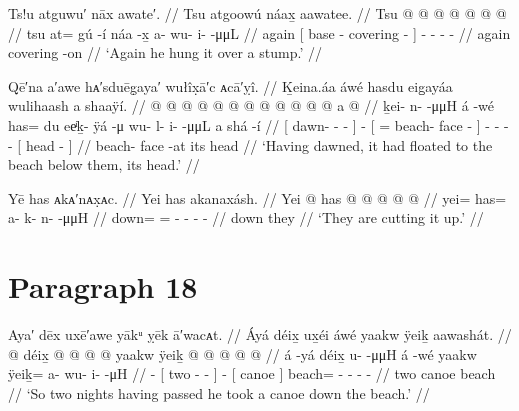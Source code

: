 \ex\label{ex:91-244-again-hung-over-stump}%
%
\begingl
	\glpreamble	Ts!u atguwu′ nāx awate′. //
	\glpreamble	Tsu atgoowú náax̱ aawatee. //
	\gla	Tsu {}  @ {} @ {}  @ {} {}
		 @ {} @ {} @ {} @ {} //
	\glb	tsu {} at= gú -í náa -x̱ {}
		a- wu- i-  -μμL //
	\glc	again {}[  base - covering - {}]
		- - -  - //
	\gld	again {}  {} {} covering -on {}
		 {} {} {} {} //
	\glft	‘Again he hung it over a stump.’
		//
\endgl
\xe

\ex\label{ex:91-245-dawned-float-beach-head}%
%
\begingl
	\glpreamble	Qē′na a′awe hᴀ′sduēg̣aya′ wułîx̣ā′c ᴀcā′ỵî. //
	\glpreamble	Ḵeina.áa áwé hasdu eig̱ayáa wulihaash a shaaÿí. //
	\gla	{}  @ {} @ {} @ {} @ {} {}  @ {}
		{}  @ {}  @ {} @ {} {}
		 @ {} @ {} @ {} @ {}
		{} a  @ {} {} //
	\glb	{} ḵei- n-  -μμH {} {} á -wé
		{} has= du eeͥḵ- ÿá -μ {}
		wu- l- i-  -μμL
		{} a shá -í {} //
	\glc	{}[ dawn- -  - \· {}]
		 -
		{}[ =  beach- face - {}]
		- - -  -
		{}[  head - {}] //
	\gld	{}  {} {} {} {} {}  {}
		{}  {} beach- face -at {}
		 {} {} {} {}
		{} its head {} {} //
	\glft	‘Having dawned, it had floated to the beach below them, its head.’
		//
\endgl
\xe

\ex\label{ex:91-246-they-cut-it-up}%
%
\begingl
	\glpreamble	Yē has ᴀkᴀ′nᴀx̣ᴀc. //
	\glpreamble	Yei has akanaxásh. //
	\gla	Yei @ has @  @ {} @ {} @ {} @ {} //
	\glb	yei= has= a- k- n-  -μμH //
	\glc	down= = - - -  - //
	\gld	down they  {} {} {} {} //
	\glft	‘They are cutting it up.’
		//
\endgl
\xe

\section{Paragraph 18}\label{sec:91-para-18}

\ex\label{ex:91-247-two-nights-took-canoe-beach}%
%
\begingl
	\glpreamble	Aya′ dēx uxē′awe yākᵘ ỵēk ā′wacᴀt. //
	\glpreamble	Áyá déix̱ ux̱éi áwé yaakw ÿeiḵ aawashát. //
	\gla	{} @ {}
		{} déix̱  @ {} @ {} @ {} {}
		 @ {}
		{} yaakw {}
		ÿeiḵ @  @ {} @ {} @ {} @ {} //
	\glb	á -yá
		{} déix̱ u-  -μμH {} {}
		á -wé
		{} yaakw {}
		ÿeiḵ= a- wu- i-  -μH //
	\glc	{} -
		{}[ two -  - \· {}]
		 -
		{}[ canoe {}]
		beach= - - -  - //
	\gld	{} {}
		{} two  {} {} {} {}
		 {}
		{} canoe {}
		beach  {} {} {} {} //
	\glft	‘So two nights having passed he took a canoe down the beach.’
		//
\endgl
\xe

